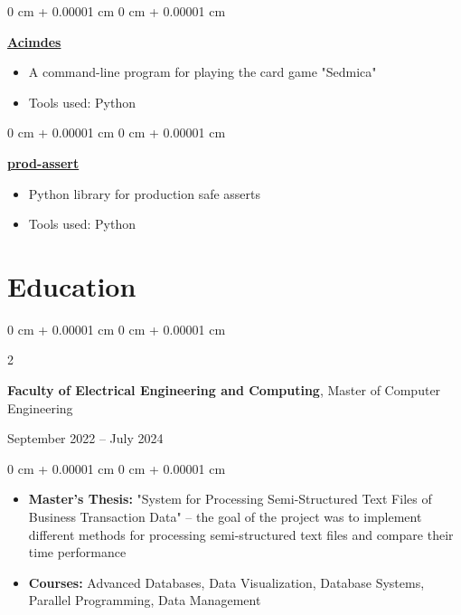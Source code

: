 \documentclass[10pt, letterpaper]{article}
\newenvironment{highlights}{
    \begin{itemize}[
        topsep=0.10 cm,
        parsep=0.10 cm,
        partopsep=0pt,
        itemsep=0pt,
        leftmargin=0 cm + 10pt
    ]
}{
    \end{itemize}
} %
\newenvironment{onecolentry}{
    \begin{adjustwidth}{
        0 cm + 0.00001 cm
    }{
        0 cm + 0.00001 cm
    }
}{
    \end{adjustwidth}
} %
\newenvironment{twocolentry}[2][]{
    \onecolentry
    \def\secondColumn{#2}
    \setcolumnwidth{\fill, 4.5 cm}
    \begin{paracol}{2}
}{
    \switchcolumn \raggedleft \secondColumn
    \end{paracol}
    \endonecolentry
} %
\begin{document}
        \vspace{0.2 cm}

        \begin{onecolentry}
            \href{https://github.com/IvanDerdicDer/Acimdes}{\textbf{Acimdes}}
            \vspace{0.10 cm}
            \begin{highlights}
                \item A command-line program for playing the card game "Sedmica"
                \item Tools used: Python
            \end{highlights}
        \end{onecolentry}

        \vspace{0.2 cm}

        \begin{onecolentry}
            \href{https://github.com/IvanDerdicDer/prod_assert}{\textbf{prod-assert}}
            \vspace{0.10 cm}
            \begin{highlights}
                \item Python library for production safe asserts
                \item Tools used: Python
            \end{highlights}
        \end{onecolentry}


    \section{Education}



        \begin{twocolentry}{
            September 2022 – July 2024
        }
            \textbf{Faculty of Electrical Engineering and Computing}, Master of Computer Engineering
        \end{twocolentry}
        
        \vspace{0.10 cm}
        \begin{onecolentry}
            \begin{highlights}
                \item \textbf{Master's Thesis:} "System for Processing Semi-Structured Text Files of Business Transaction Data" – the goal of the project was to implement different methods for processing semi-structured text files and compare their time performance
                \item \textbf{Courses:} Advanced Databases, Data Visualization, Database Systems, Parallel Programming, Data Management
            \end{highlights}
        \end{onecolentry}   
\end{document}
